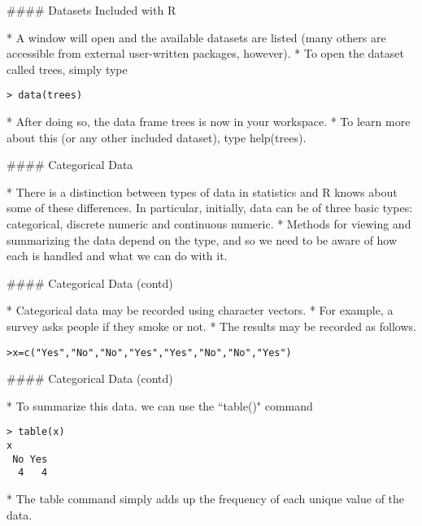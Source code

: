 #### {Datasets Included with R}

* A window will open and the available datasets are listed (many others are accessible from
external user-written packages, however). * To open the dataset called trees, simply type

\begin{verbatim}
> data(trees)
\end{verbatim}

* After doing so, the data frame trees is now in your workspace. *  To learn more about this (or
any other included dataset), type help(trees).



#### {Categorical Data}

* 
There is a distinction between types of data in statistics and R knows about some of these differences. In particular,
initially, data can be of three basic types: categorical, discrete numeric and continuous numeric. * Methods for viewing
and summarizing the data depend on the type, and so we need to be aware of how each is handled and what we can
do with it.




#### {Categorical Data (contd)}

* Categorical data may be recorded using character vectors.
* For example, a survey asks people if they smoke or not. * The results may be recorded as follows.

\begin{verbatim}
>x=c("Yes","No","No","Yes","Yes","No","No","Yes")
\end{verbatim}


#### {Categorical Data (contd)}

* To summarize this data. we can use the ``table()" command

\begin{verbatim}
> table(x)
x
 No Yes
  4   4
\end{verbatim}

* The table command simply adds up the frequency of each unique value of the data.


